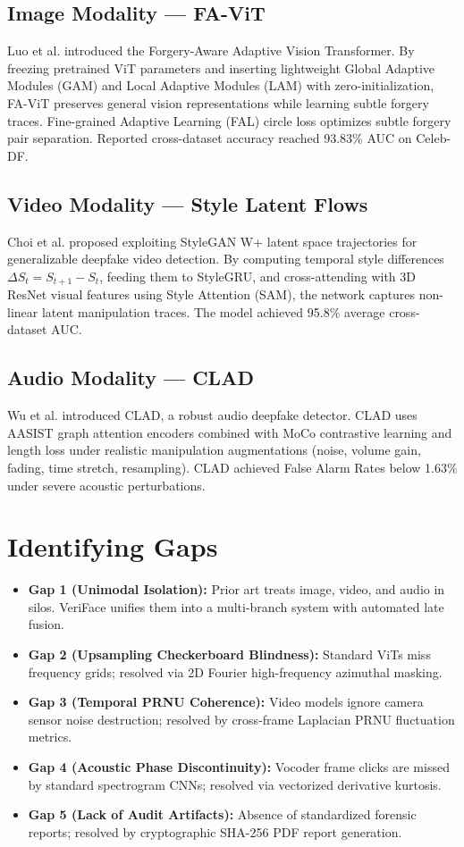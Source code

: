 \documentclass[12pt,a4paper]{report}
\begin{document}
\subsection{Image Modality --- FA-ViT}
Luo et al. introduced the Forgery-Aware Adaptive Vision Transformer. By freezing pretrained ViT parameters and inserting lightweight Global Adaptive Modules (GAM) and Local Adaptive Modules (LAM) with zero-initialization, FA-ViT preserves general vision representations while learning subtle forgery traces. Fine-grained Adaptive Learning (FAL) circle loss optimizes subtle forgery pair separation. Reported cross-dataset accuracy reached 93.83\% AUC on Celeb-DF.

\subsection{Video Modality --- Style Latent Flows}
Choi et al. proposed exploiting StyleGAN W+ latent space trajectories for generalizable deepfake video detection. By computing temporal style differences $\Delta S_t = S_{t+1}-S_t$, feeding them to StyleGRU, and cross-attending with 3D ResNet visual features using Style Attention (SAM), the network captures non-linear latent manipulation traces. The model achieved 95.8\% average cross-dataset AUC.

\subsection{Audio Modality --- CLAD}
Wu et al. introduced CLAD, a robust audio deepfake detector. CLAD uses AASIST graph attention encoders combined with MoCo contrastive learning and length loss under realistic manipulation augmentations (noise, volume gain, fading, time stretch, resampling). CLAD achieved False Alarm Rates below 1.63\% under severe acoustic perturbations.

\section{Identifying Gaps}
\begin{itemize}[leftmargin=*]
    \item \textbf{Gap 1 (Unimodal Isolation):} Prior art treats image, video, and audio in silos. VeriFace unifies them into a multi-branch system with automated late fusion.
    \item \textbf{Gap 2 (Upsampling Checkerboard Blindness):} Standard ViTs miss frequency grids; resolved via 2D Fourier high-frequency azimuthal masking.
    \item \textbf{Gap 3 (Temporal PRNU Coherence):} Video models ignore camera sensor noise destruction; resolved by cross-frame Laplacian PRNU fluctuation metrics.
    \item \textbf{Gap 4 (Acoustic Phase Discontinuity):} Vocoder frame clicks are missed by standard spectrogram CNNs; resolved via vectorized derivative kurtosis.
    \item \textbf{Gap 5 (Lack of Audit Artifacts):} Absence of standardized forensic reports; resolved by cryptographic SHA-256 PDF report generation.
\end{itemize}
\end{document}
